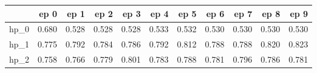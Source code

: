 \begin{tabular}{lrrrrrrrrrr}
\toprule
{} &   ep 0 &   ep 1 &   ep 2 &   ep 3 &   ep 4 &   ep 5 &   ep 6 &   ep 7 &   ep 8 &   ep 9 \\
\midrule
hp\_0 &  0.680 &  0.528 &  0.528 &  0.528 &  0.533 &  0.532 &  0.530 &  0.530 &  0.530 &  0.530 \\
hp\_1 &  0.775 &  0.792 &  0.784 &  0.786 &  0.792 &  0.812 &  0.788 &  0.788 &  0.820 &  0.823 \\
hp\_2 &  0.758 &  0.766 &  0.779 &  0.801 &  0.783 &  0.788 &  0.781 &  0.796 &  0.786 &  0.781 \\
\bottomrule
\end{tabular}
